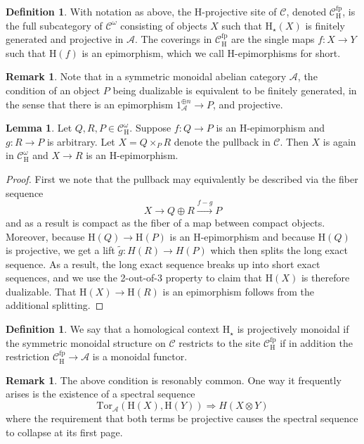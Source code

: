 \documentclass[10pt]{amsart}
\theoremstyle{definition}
\numberwithin{figure}{section}
\numberwithin{equation}{section}
\newtheorem{lemma}[figure]{Lemma}
\newtheorem{definition}[figure]{Definition}
\newtheorem{remark}[figure]{Remark}
\newcommand{\cA}{\mathcal{A}}
\newcommand{\cC}{\mathcal{C}}
\newcommand{\one}{\mathrm{1}}
\theoremstyle{cited}
\newcommand{\fp}{\mathrm{fp}}
\renewcommand{\H}{\mathrm{H}}
\newcommand{\Tor}{\mathrm{Tor}}
\begin{document}
\begin{definition}\label{def:projectivesite}
  With notation as above, the $\H$-projective site of $\cC$, denoted $\cC^{\fp}_{\H}$, is the full subcategory of $\cC^\omega$ consisting of objects $X$ such that $\H_{\star}(X)$ is finitely generated and projective in $\cA$. The coverings in $\cC^\fp_{\H}$ are the single maps $f:X\to Y$ such that $\H(f)$ is an epimorphism, which we call $\H$-epimorphisms for short.
\end{definition}

\begin{remark}
  Note that in a symmetric monoidal abelian category $\cA$, the condition of an object $P$ being dualizable is equivalent to be finitely generated, in the sense that there is an epimorphism $\one_{\cA}^{\oplus n}\to P$, and projective.
\end{remark}

\begin{lemma}
  \label{lem:sitepullbacks}
  Let $Q,R,P\in \cC^\omega_\H$. Suppose $f:Q\to P$ is an $\H$-epimorphism and $g:R\to P$ is arbitrary. Let $X=Q\times_P R$ denote the pullback in $\cC$. Then $X$ is again in $\cC^\omega_\H$ and $X\to R$ is an $\H$-epimorphism.
\end{lemma}

\begin{proof}
  First we note that the pullback may equivalently be described via the fiber sequence
  \[
  X\to Q\oplus R \xrightarrow{f-g} P
  \]
  and as a result is compact as the fiber of a map between compact objects. Moreover, because $\H(Q)\to \H(P)$ is an $\H$-epimorphism and because $\H(Q)$ is projective, we get a lift $\tilde g:H(R)\to H(P)$ which then splits the long exact sequence. As a result, the long exact sequence breaks up into short exact sequences, and we use the 2-out-of-3 property to claim that $\H(X)$ is therefore dualizable. That $\H(X)\to \H(R)$ is an epimorphism follows from the additional splitting.
\end{proof}

\begin{definition}
  We say that a homological context $\H_\star$ is projectively monoidal if 
  the symmetric monoidal structure on $\cC$ restricts to the site $\cC^\fp_\H$ if in addition the restriction $\cC^\fp_\H\to \cA$ is a monoidal functor.
\end{definition}

\begin{remark}
  The above condition is resonably common. One way it frequently arises is the existence of a spectral sequence 
  \[
  \Tor_{\cA}(\H(X),\H(Y))\Rightarrow H(X\otimes Y)
  \]
  where the requirement that both terms be projective causes the spectral sequence to collapse at its first page.
\end{remark}
\end{document}
